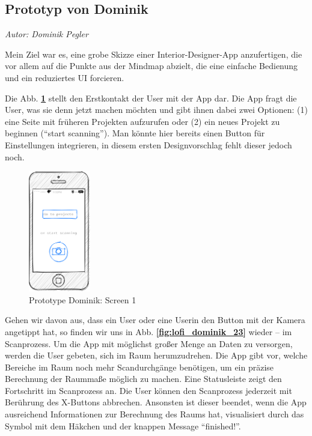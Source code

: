 \documentclass[12pt,paper=a4,oneside,hidelinks,headings=small,captions=heading,captions=nooneline]{scrartcl}
\begin{document}
\subsection{Prototyp von Dominik}
\label{sec:org420f740}
\emph{Autor: Dominik Pegler}

Mein Ziel war es, eine grobe Skizze einer Interior-Designer-App
anzufertigen, die vor allem auf die Punkte aus der Mindmap abzielt,
die eine einfache Bedienung und ein reduziertes UI forcieren.

Die Abb. \textbf{\ref{fig:lofi_dominik_1}} stellt den Erstkontakt der User mit der
App dar. Die App fragt die User, was sie denn jetzt machen möchten und
gibt ihnen dabei zwei Optionen: (1) eine Seite mit früheren Projekten
aufzurufen oder (2) ein neues Projekt zu beginnen ("`start
scanning"'). Man könnte hier bereits einen Button für Einstellungen
integrieren, in diesem ersten Designvorschlag fehlt dieser jedoch
noch.

\begin{figure}[htbp]
\centering
\includegraphics[height=200px]{./img/m2_lofi_dominik_1.png}
\caption{\label{fig:lofi_dominik_1}Prototype Dominik: Screen 1}
\end{figure}

Gehen wir davon aus, dass ein User oder eine Userin den Button mit der
Kamera angetippt hat, so finden wir uns in Abb. \textbf{\ref{fig:lofi_dominik_23}}
wieder -- im Scanprozess. Um die App mit möglichst großer Menge an
Daten zu versorgen, werden die User gebeten, sich im Raum
herumzudrehen. Die App gibt vor, welche Bereiche im Raum noch mehr
Scandurchgänge benötigen, um ein präzise Berechnung der Raummaße
möglich zu machen. Eine Statusleiste zeigt den Fortschritt im
Scanprozess an. Die User können den Scanprozess jederzeit mit
Berührung des X-Buttons abbrechen. Ansonsten ist dieser beendet, wenn
die App ausreichend Informationen zur Berechnung des Raums hat,
visualisiert durch das Symbol mit dem Häkchen und der knappen Message
"`finished!"'.
\end{document}
